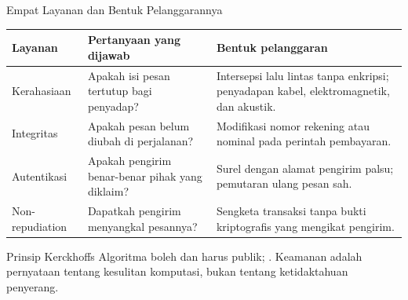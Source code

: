 \documentclass[aspectratio=169,11pt]{beamer}
\begin{document}
\begin{frame}{Empat Layanan dan Bentuk Pelanggarannya}
    \scriptsize
    \begin{tabularx}{\linewidth}{@{}>{\raggedright\arraybackslash}p{2.0cm} >{\raggedright\arraybackslash}p{5.0cm} >{\raggedright\arraybackslash}X@{}}
        \toprule
        \textbf{Layanan} & \textbf{Pertanyaan yang dijawab} & \textbf{Bentuk pelanggaran} \\
        \midrule
        Kerahasiaan & Apakah isi pesan tertutup bagi penyadap? & Intersepsi lalu lintas tanpa enkripsi; penyadapan kabel, elektromagnetik, dan akustik. \\
        \addlinespace[2pt]
        Integritas & Apakah pesan belum diubah di perjalanan? & Modifikasi nomor rekening atau nominal pada perintah pembayaran. \\
        \addlinespace[2pt]
        Autentikasi & Apakah pengirim benar-benar pihak yang diklaim? & Surel dengan alamat pengirim palsu; pemutaran ulang pesan sah. \\
        \addlinespace[2pt]
        Non-repudiation & Dapatkah pengirim menyangkal pesannya? & Sengketa transaksi tanpa bukti kriptografis yang mengikat pengirim. \\
        \bottomrule
    \end{tabularx}
    \vspace{0.2cm}
    \begin{alertblock}{Prinsip Kerckhoffs}
        \footnotesize
        Algoritma boleh dan harus publik; .
        Keamanan adalah pernyataan tentang kesulitan komputasi, bukan tentang
        ketidaktahuan penyerang.
    \end{alertblock}
\end{frame}
\end{document}
